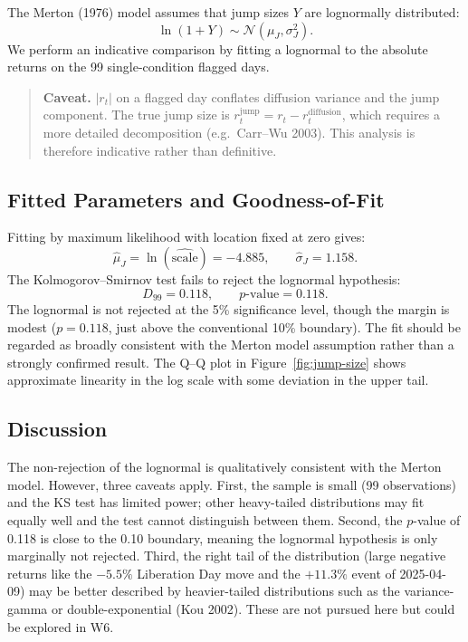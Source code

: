 \documentclass[11pt,a4paper]{article}
\begin{document}
The Merton (1976) model assumes that jump sizes $Y$ are lognormally distributed:
\[
\ln(1+Y)\sim \mathcal{N}(\mu_J,\sigma_J^2).
\]
We perform an indicative comparison by fitting a lognormal to the absolute returns on the 99 single-condition flagged days.

\begin{quote}
\textbf{Caveat.} $|r_t|$ on a flagged day conflates diffusion variance and the jump component. The true jump size is $r_t^{\text{jump}} = r_t - r_t^{\text{diffusion}}$, which requires a more detailed decomposition (e.g.\ Carr--Wu 2003). This analysis is therefore indicative rather than definitive.
\end{quote}

\subsection{Fitted Parameters and Goodness-of-Fit}

Fitting by maximum likelihood with location fixed at zero gives:
\[
\hat{\mu}_J=\ln(\widehat{\mathrm{scale}})=-4.885,
\qquad
\hat{\sigma}_J=1.158.
\]
The Kolmogorov--Smirnov test fails to reject the lognormal hypothesis:
\[
D_{99}=0.118,
\qquad
p\text{-value}=0.118.
\]
The lognormal is not rejected at the 5\% significance level, though the margin is modest ($p = 0.118$, just above the conventional 10\% boundary). The fit should be regarded as broadly consistent with the Merton model assumption rather than a strongly confirmed result. The Q--Q plot in Figure~\ref{fig:jump-size} shows approximate linearity in the log scale with some deviation in the upper tail.

\subsection{Discussion}

The non-rejection of the lognormal is qualitatively consistent with the Merton model. However, three caveats apply. First, the sample is small (99 observations) and the KS test has limited power; other heavy-tailed distributions may fit equally well and the test cannot distinguish between them. Second, the $p$-value of 0.118 is close to the 0.10 boundary, meaning the lognormal hypothesis is only marginally not rejected. Third, the right tail of the distribution (large negative returns like the $-5.5\%$ Liberation Day move and the $+11.3\%$ event of 2025-04-09) may be better described by heavier-tailed distributions such as the variance-gamma or double-exponential (Kou 2002). These are not pursued here but could be explored in W6.
\end{document}

